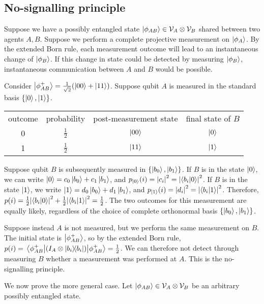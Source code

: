 \subsection{No-signalling principle}
Suppose we have a possibly entangled state \( \ket{\phi_{AB}} \in \mathcal V_A \otimes \mathcal V_B \) shared between two agents \( A, B \).
Suppose we perform a complete projective measurement on \( \ket{\phi_A} \).
By the extended Born rule, each measurement outcome will lead to an instantaneous change of \( \ket{\phi_B} \).
If this change in state could be detected by measuring \( \ket{\phi_B} \), instantaneous communication between \( A \) and \( B \) would be possible.

Consider \( \ket{\phi_{AB}^+} = \frac{1}{\sqrt{2}}\qty(\ket{00} + \ket{11}) \).
Suppose qubit \( A \) is measured in the standard basis \( \qty{\ket{0}, \ket{1}} \).
\begin{center}
    \begin{tabular}{c c c c}
        outcome & probability & post-measurement state & final state of \( B \) \\
        0 & \( \frac{1}{2} \) & \( \ket{00} \) & \( \ket{0} \) \\
        1 & \( \frac{1}{2} \) & \( \ket{11} \) & \( \ket{1} \)
    \end{tabular}
\end{center}
Suppose qubit \( B \) is subsequently measured in \( \qty{\ket{b_0}, \ket{b_1}} \).
If \( B \) is in the state \( \ket{0} \), we can write \( \ket{0} = c_0\ket{b_0} + c_1\ket{b_1} \), and \( p_{\ket{0}}(i) = \abs{c_i}^2 = \abs{\ip{b_i}{0}}^2 \).
If \( B \) is in the state \( \ket{1} \), we write \( \ket{1} = d_0\ket{b_0} + d_1\ket{b_1} \), and \( p_{\ket{1}}(i) = \abs{d_i}^2 = \abs{\ip{b_i}{1}}^2 \).
Therefore, \( p(i) = \frac{1}{2} \abs{\ip{b_i}{0}}^2 + \frac{1}{2} \abs{\ip{b_i}{1}}^2 = \frac{1}{2} \).
The two outcomes for this measurement are equally likely, regardless of the choice of complete orthonormal basis \( \qty{\ket{b_0}, \ket{b_1}} \).

Suppose instead \( A \) is not measured, but we perform the same measurement on \( B \).
The initial state is \( \ket{\phi_{AB}^+} \), so by the extended Born rule, \( p(i) = \ev{\qty(I_A \otimes \op{b_i}{b_i})}{\phi_{AB}^+} = \frac{1}{2} \).
We can therefore not detect through measuring \( B \) whether a measurement was performed at \( A \).
This is the no-signalling principle.

We now prove the more general case.
Let \( \ket{\phi_{AB}} \in \mathcal V_A \otimes \mathcal V_B \) be an arbitrary possibly entangled state.

